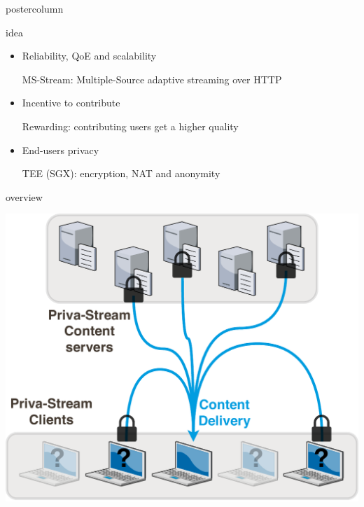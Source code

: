 \begin{frame}
\begin{columns}
\begin{column}{.49\textwidth}
\begin{beamercolorbox}[center,wd=\textwidth]{postercolumn}
\begin{minipage}[T]{.95\textwidth}
{            \begin{block}{ idea}
            
            \begin{itemize}
            
            \item Reliability, QoE and scalability
            
            MS-Stream: Multiple-Source adaptive streaming over HTTP
            
            \item Incentive to contribute
            
            Rewarding: contributing users get a higher quality
            
            \item End-users privacy
            
            TEE (SGX): encryption, NAT and anonymity
            
            \end{itemize}
            
            \end{block}
            
            \vfill
            
            \begin{block}{ overview}
            
            \centering
            
            \includegraphics[width=.925\textwidth]{sample/BP.pdf}
            
            \end{block}
            
}
\end{minipage}
\end{beamercolorbox}
\end{column}
\end{columns}
\end{frame}
